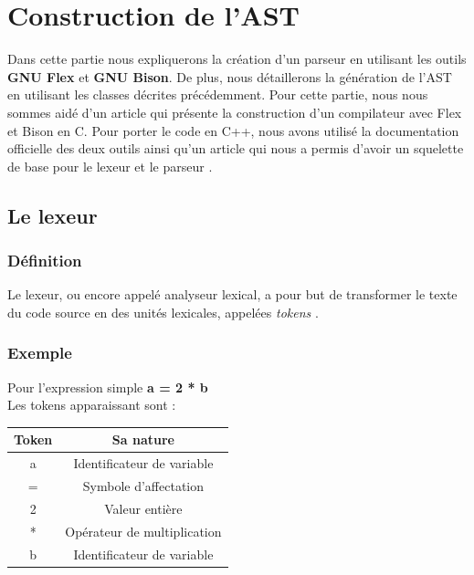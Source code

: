 \documentclass[a4paper]{article}%
\begin{document}
\clearpage{}

\section{Construction de l'AST}

Dans cette partie nous expliquerons la création d'un parseur en utilisant les
outils \textbf{GNU Flex} et \textbf{GNU Bison}. De plus, nous détaillerons la
génération de l'AST en utilisant les classes décrites précédemment. Pour cette
partie, nous nous sommes aidé d'un article \cite{compilerFlexBison} qui présente
la construction d'un compilateur avec Flex et Bison en C. Pour porter le code en
C++, nous avons utilisé la documentation officielle des deux outils ainsi qu'un
article qui nous a permis d'avoir un squelette de base pour le lexeur et le
parseur \cite{cppparsing}.

\subsection{Le lexeur}

\subsubsection*{Définition}

Le lexeur, ou encore appelé analyseur lexical, a pour but de transformer le
texte du code source en des unités lexicales, appelées \textit{tokens}
\cite{flexBisonHandbook}. \\

\subsubsection*{Exemple}

Pour l'expression simple \textbf{a = 2 * b} \\
Les tokens apparaissant sont : \\
\begin{center}
  \begin{tabular}{ | c | c | }
    \hline
    \textbf{Token} & \textbf{Sa nature} \\
    \hline
    a & Identificateur de variable \\
    \hline
    = & Symbole d'affectation \\
    \hline
    2 & Valeur entière \\
    \hline
    * & Opérateur de multiplication \\
    \hline
    b & Identificateur de variable \\
    \hline
  \end{tabular}
\end{center}
\end{document}
